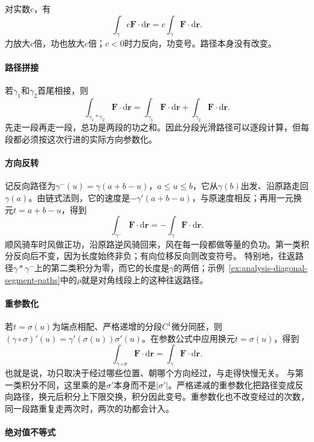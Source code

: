 对实数$c$，有
\[
 \int_\gamma c\bm F\cdot\mathrm d\bm r
 =c\int_\gamma\bm F\cdot\mathrm d\bm r.
\]
力放大$c$倍，功也放大$c$倍；$c<0$时力反向，功变号。路径本身没有改变。

\paragraph{路径拼接}

若$\gamma_1$和$\gamma_2$首尾相接，则
\[
 \int_{\gamma_1*\gamma_2}\bm F\cdot\mathrm d\bm r
 =\int_{\gamma_1}\bm F\cdot\mathrm d\bm r
 +\int_{\gamma_2}\bm F\cdot\mathrm d\bm r.
\]
先走一段再走一段，总功是两段的功之和。因此分段光滑路径可以逐段计算，但每段都必须按这次行进的实际方向参数化。

\paragraph{方向反转}

记反向路径为$\gamma^{-}(u)=\gamma(a+b-u)$，$a\leq u\leq b$，它从$\gamma(b)$出发、沿原路走回$\gamma(a)$。由链式法则，它的速度是$-\gamma'(a+b-u)$，与原速度相反；再用一元换元$t=a+b-u$，得到
\[
 \int_{\gamma^{-}}\bm F\cdot\mathrm d\bm r
 =-\int_\gamma\bm F\cdot\mathrm d\bm r.
\]
顺风骑车时风做正功，沿原路逆风骑回来，风在每一段都做等量的负功。第一类积分反向后不变，因为长度始终非负；有向位移反向则改变符号。
特别地，往返路径$\gamma*\gamma^{-}$上的第二类积分为零，而它的长度是$\gamma$的两倍；示例~\ref{ex:analysis-diagonal-segment-paths}中的$\rho$就是对角线段上的这种往返路径。

\paragraph{重参数化}

若$t=\sigma(u)$为端点相配、严格递增的分段$C^1$微分同胚，则
$(\gamma\circ\sigma)'(u)=\gamma'(\sigma(u))\sigma'(u)$。在参数公式中应用换元$t=\sigma(u)$，得到
\[
 \int_{\gamma\circ\sigma}\bm F\cdot\mathrm d\bm r
 =\int_\gamma\bm F\cdot\mathrm d\bm r.
\]
也就是说，功只取决于经过哪些位置、朝哪个方向经过，与走得快慢无关。
与第一类积分不同，这里乘的是$\sigma'$本身而不是$|\sigma'|$。严格递减的重参数化把路径变成反向路径，换元后积分上下限交换，积分因此变号。重参数化也不改变经过的次数，同一段路重复走两次时，两次的功都会计入。

\paragraph{绝对值不等式}

